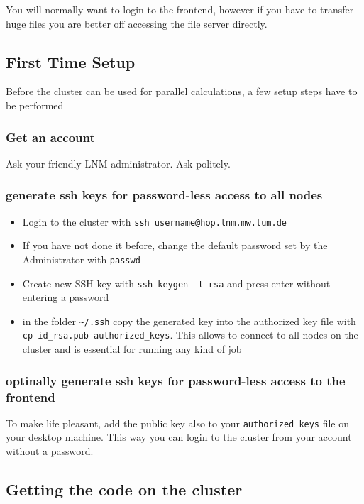 You will normally want to login to the frontend, however if you have
to transfer huge files you are better off accessing the file server
directly.


\subsection{First Time Setup }

Before the cluster can be used for parallel calculations, a few setup
steps have to be performed 


\subsubsection{Get an account}

Ask your friendly LNM administrator. Ask politely.


\subsubsection{generate ssh keys for password-less access to all nodes}

\begin{itemize}
\item Login to the cluster with \texttt{ssh username@hop.lnm.mw.tum.de} 
\item If you have not done it before, change the default password set by
the Administrator with \texttt{passwd }
\item Create new SSH key with \texttt{ssh-keygen -t rsa} and press enter
without entering a password
\item in the folder \texttt{\textasciitilde{}/.ssh} copy the generated key
into the authorized key file with \texttt{cp id\_rsa.pub authorized\_keys}.
This allows to connect to all nodes on the cluster and is essential
for running any kind of job 
\end{itemize}

\subsubsection{optinally generate ssh keys for password-less access to the frontend }

To make life pleasant, add the public key also to your \texttt{authorized\_keys}
file on your desktop machine. This way you can login to the cluster
from your account without a password.


\subsection{Getting the code on the cluster}

